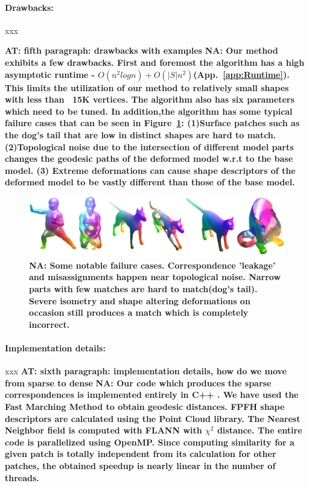 \documentclass[10pt,twocolumn,letterpaper]{article}
\newcommand{\colornote}[3]{{\color{#1}\bf{#2: #3}\normalfont}}
\newcommand{\colornote}[3]{}
\newcommand {\ayellet}[1]{\colornote{blue}{AT}{#1}}
\newcommand {\nadav}[1]{\colornote{red}{NA}{#1}}
\begin{document}
\paragraph{Drawbacks:} xxx


\ayellet{fifth paragraph: drawbacks with examples}
\nadav{Our method exhibits a few drawbacks.
    First and foremost the algorithm has a high asymptotic runtime - $O(n^2logn) + O(|S|n^2)$(App.~\ref{app:Runtime}). 
	This limits the utilization of our method to relatively small shapes with less than ~15K vertices. 
	The algorithm also has six parameters which need to be tuned. 
	In addition,the algorithm has some typical failure cases that can be seen in Figure~\ref{fig:FailureCases}: 
	(1)Surface patches such as the dog's tail that are low in distinct shapes are hard to match. (2)Topological noise due to the intersection of different model parts changes the geodesic paths of the deformed model w.r.t to the base model.
(3) Extreme deformations can cause shape descriptors of the deformed model to be vastly different than those of the base model.}

\begin{figure}[htb]
	\centering
	\includegraphics[width=1\textwidth]{figures/failures.png}
	\caption{\nadav{Some notable failure cases. Correspondence 'leakage' and misassignments happen near topological noise. Narrow parts with few matches are hard to match(dog's tail). Severe isometry and shape altering deformations on occasion still produces a match which is completely incorrect.}}
	\label{fig:FailureCases}
\end{figure}

\paragraph{Implementation details:} xxx
\ayellet{sixth paragraph: implementation details, how do we move from sparse to dense}
\nadav{Our code which produces the sparse correspondences is implemented entirely in C++ . 
We have used the Fast Marching Method\cite{kimmel1996fast} to obtain geodesic distances.
FPFH shape descriptors are calculated using the Point Cloud library\cite{Rusu_ICRA2011_PCL}. 
The Nearest Neighbor field is computed with FLANN\cite{muja2009fast} with $\chi^2$ distance.
The entire code is parallelized using OpenMP. Since computing similarity for a given patch is totally independent from its calculation for other patches, the obtained speedup is nearly linear in the number of threads. 
}
\end{document}

